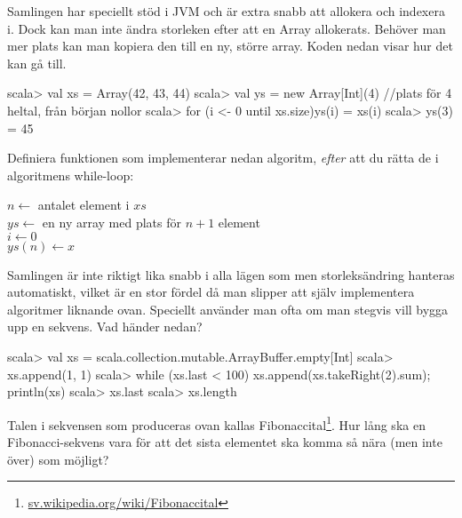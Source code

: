 \Subtask Samlingen  har speciellt stöd i JVM och är extra snabb att allokera och indexera i. Dock kan man inte ändra storleken efter att en Array allokerats. Behöver man mer plats kan man kopiera den till en ny, större array. Koden nedan visar hur det kan gå till.
\begin{REPL}
scala> val xs = Array(42, 43, 44)
scala> val ys = new Array[Int](4)  //plats för 4 heltal, från början nollor
scala> for (i <- 0 until xs.size){ys(i) = xs(i)}
scala> ys(3) = 45
\end{REPL}
Definiera funktionen  som implementerar nedan algoritm, \emph{efter} att du rätta de \textbf{\color{red}{två buggarna}} i algoritmens while-loop:

\begin{algorithm}[H]

 $n \leftarrow$ antalet element i $xs$ \\
 $ys \leftarrow$ en ny array med plats för $n + 1$ element\\
 $i \leftarrow 0$  \\
 $ys(n) \leftarrow x$
\end{algorithm}



\Subtask Samlingen  är inte riktigt lika snabb i alla lägen som  men storleksändring hanteras automatiskt, vilket är en stor fördel då man slipper att själv implementera algoritmer liknande  ovan. Speciellt använder man ofta  om man stegvis vill bygga upp en sekvens. Vad händer nedan?
\begin{REPL}
scala> val xs = scala.collection.mutable.ArrayBuffer.empty[Int]
scala> xs.append(1, 1)
scala> while (xs.last < 100) {xs.append(xs.takeRight(2).sum); println(xs)}
scala> xs.last
scala> xs.length
\end{REPL}

\Subtask Talen i sekvensen som produceras ovan kallas Fibonaccital\footnote{\href{https://sv.wikipedia.org/wiki/Fibonaccital}{sv.wikipedia.org/wiki/Fibonaccital}}. Hur lång ska en Fibonacci-sekvens vara för att det sista elementet ska komma så nära (men inte över)  som möjligt?



